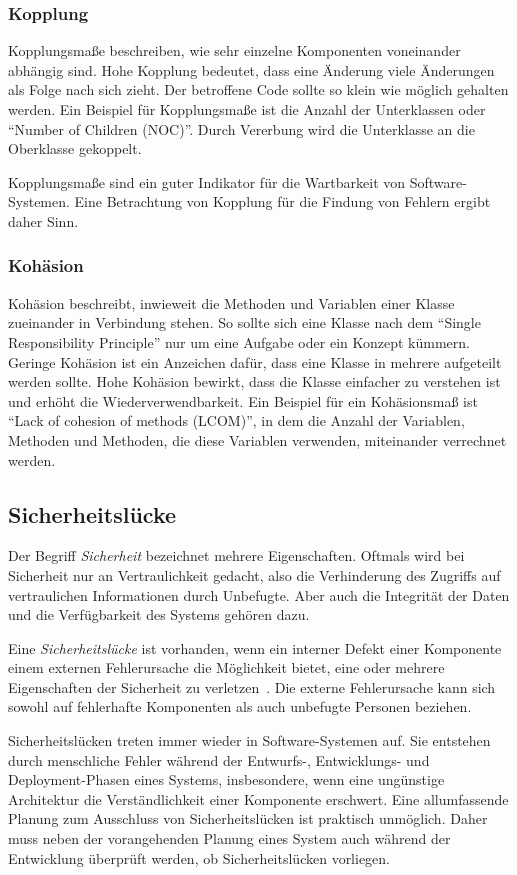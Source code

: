 \subsubsection{Kopplung}
Kopplungsmaße beschreiben, wie sehr einzelne Komponenten voneinander abhängig sind.
Hohe Kopplung bedeutet, dass eine Änderung viele Änderungen als Folge nach sich zieht.
Der betroffene Code sollte so klein wie möglich gehalten werden.
Ein Beispiel für Kopplungsmaße ist die Anzahl der Unterklassen oder "`Number of Children (NOC)"'.
Durch Vererbung wird die Unterklasse an die Oberklasse gekoppelt.

Kopplungsmaße sind ein guter Indikator für die Wartbarkeit von Software-Systemen.
Eine Betrachtung von Kopplung für die Findung von Fehlern ergibt daher Sinn.

\subsubsection{Kohäsion}
Kohäsion beschreibt, inwieweit die Methoden und Variablen einer Klasse zueinander in Verbindung stehen.
So sollte sich eine Klasse nach dem "`Single Responsibility Principle"' nur um eine Aufgabe oder ein Konzept kümmern.
Geringe Kohäsion ist ein Anzeichen dafür, dass eine Klasse in mehrere aufgeteilt werden sollte.
Hohe Kohäsion bewirkt, dass die Klasse einfacher zu verstehen ist und erhöht die Wiederverwendbarkeit.
Ein Beispiel für ein Kohäsionsmaß ist "`Lack of cohesion of methods (LCOM)"', in dem die Anzahl der Variablen, Methoden und Methoden, die diese Variablen verwenden, miteinander verrechnet werden.

\subsection{Sicherheitslücke}
Der Begriff \emph{Sicherheit} bezeichnet mehrere Eigenschaften.
Oftmals wird bei Sicherheit nur an Vertraulichkeit gedacht, also die Verhinderung des Zugriffs auf vertraulichen Informationen durch Unbefugte.
Aber auch die Integrität der Daten und die Verfügbarkeit des Systems gehören dazu.

Eine \emph{Sicherheitslücke} ist vorhanden, wenn ein interner Defekt einer Komponente einem externen Fehlerursache die Möglichkeit bietet, eine oder mehrere Eigenschaften der Sicherheit zu verletzen~\cite{basics}.
Die externe Fehlerursache kann sich sowohl auf fehlerhafte Komponenten als auch unbefugte Personen beziehen.

Sicherheitslücken treten immer wieder in Software-Systemen auf.
Sie entstehen durch menschliche Fehler während der Entwurfs-, Entwicklungs- und Deployment-Phasen eines Systems, insbesondere, wenn eine ungünstige Architektur die Verständlichkeit einer Komponente erschwert.
Eine allumfassende Planung zum Ausschluss von Sicherheitslücken ist praktisch unmöglich.
Daher muss neben der vorangehenden Planung eines System auch während der Entwicklung überprüft werden, ob Sicherheitslücken vorliegen.
